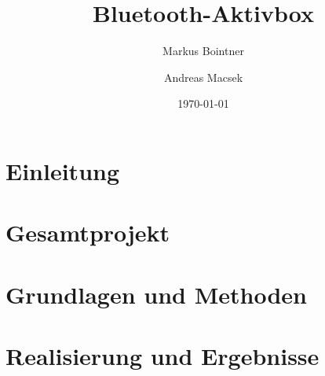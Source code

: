 \documentclass[paper=a4, 12pt]{scrreprt}
\title{Bluetooth-Aktivbox}
\author{Markus Bointner \and Andreas Macsek}
\date{\today}
\begin{document}
\frontmatter

\maketitle

\newpage\null\thispagestyle{empty}\newpage

\begin{affidavit}
\end{affidavit}




\tableofcontents

\mainmatter

\chapter{Einleitung}


\chapter{Gesamtprojekt}
       
    
\chapter{Grundlagen und Methoden}


\chapter{Realisierung und Ergebnisse}



\end{document}
